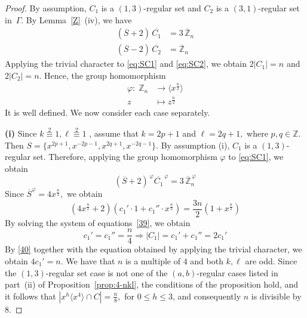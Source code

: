 \documentclass[12pt]{article}
\begin{document}
  	\begin{proof}
  	By assumption, $C_1$ is a $(1,3)$-regular set and $C_2$ is a $(3,1)$-regular set in~$\Gamma$. By Lemma~\ref{Z}~(iv), we have
  	\begin{align}
  		(\overline{S}+2)\,\overline{C_1} &= 3\,\overline{\mathbb{Z}}_n \label{eq:SC1}\\
  		(\overline{S}-2)\,\overline{C_2} &= \overline{\mathbb{Z}}_n \label{eq:SC2}
  	\end{align}
  Applying the trivial character to \eqref{eq:SC1} and \eqref{eq:SC2}, we obtain
  $
  2|C_1|=n$
  and
 $ 2|C_2|=n.$
  Hence, the group homomorphism
  	\[
  \begin{aligned}
  	\varphi :\; \mathbb{Z}_n &\to \langle x^{\frac{n}{2}} \rangle \\
  	z &\mapsto z^{\frac{n}{2}}
  \end{aligned}
  \]
 It is well defined. We now consider each case separately.

  \textbf{(i)} Since  $
  k\stackrel{2}{\equiv}1, \ell\stackrel{2}{\equiv}1$
 , assume that
  $
  k=2p+1$ and $\ell=2q+1,
  $
  where $p,q\in\mathbb{Z}$. Then
  $
  S=\{x^{2p+1},x^{-2p-1},x^{2q+1},x^{-2q-1}\}.
  $
  By assumption (i), $C_1$ is a $(1,3)$-regular set. Therefore, applying the group homomorphism $\varphi$ to \eqref{eq:SC1}, we obtain
  \begin{equation}\label{38}
  	(\overline{S}+2)^ {\,\varphi}\overline{C_1}^{\,\varphi}=3\, \overline{\mathbb{Z}}_n^{\,\varphi}
  \end{equation}
  Since
  $
  \overline{S}^{\varphi}=4x^{\frac{n}{2}},
  $
  we obtain
  \begin{equation}\label{39}
  	\left(4x^{\frac{n}{2}}+2\right)
  	\left(c_1' \cdot 1+c_1''  \cdot x^{\frac{n}{2}}\right)
  	=
  	\frac{3n}{2}\left(1+x^{\frac{n}{2}}\right)
  \end{equation}
  By solving the system of equations~\eqref{39}, we obtain
    \begin{equation}\label{40}
  c_1'=c_1''=\frac{n}{4}
  	\Longrightarrow
  |C_1|=c_1'+c_1''=2c_1'	
\end{equation}
By \eqref{40} together with the equation obtained by applying the trivial character, we obtain
$
4c_1'=n.
$
We have that \(n\) is a multiple of \(4\) and both \(k,\ell\) are odd. Since the \((1,3)\)-regular set case is not one of the \((a,b)\)-regular cases listed in part~(ii) of Proposition~\ref{prop:4-nkl}, the conditions of the proposition hold, and it follows that $
\left|x^{h}\langle x^{4}\rangle\cap C\right|
=\frac{n}{8},
$ for \(0\le h\le 3\), and consequently \(n\) is divisible by \(8\).


\end{proof}
\end{document}
